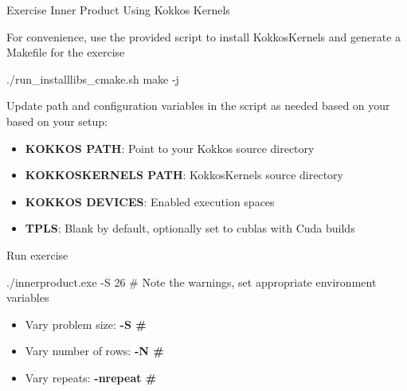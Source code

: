 \begin{frame}[fragile]{Exercise Inner Product Using Kokkos Kernels}

  For convenience, use the provided script to install KokkosKernels and generate a Makefile for the exercise

  \begin{code}
    ./run_installlibs_cmake.sh
    make -j
  \end{code}

  Update path and configuration variables in the script as needed based on your based on your setup:

  \begin{scriptsize}
  \begin{itemize}
    \item \textbf{KOKKOS PATH}: Point to your Kokkos source directory
    \item \textbf{KOKKOSKERNELS PATH}: KokkosKernels source directory
    \item \textbf{KOKKOS DEVICES}: Enabled execution spaces
    \item \textbf{TPLS}: Blank by default, optionally set to cublas with Cuda builds
  \end{itemize}
  \end{scriptsize}

  Run exercise

  \begin{code}
    ./innerproduct.exe -S 26
    # Note the warnings, set appropriate environment variables
  \end{code}

  \begin{scriptsize}
  \begin{itemize}
  \item Vary problem size: \textbf{-S \#}
  \item Vary number of rows: \textbf{-N \#}
  \item Vary repeats: \textbf{-nrepeat \#}
  \end{itemize}
  \end{scriptsize}


\end{frame}




